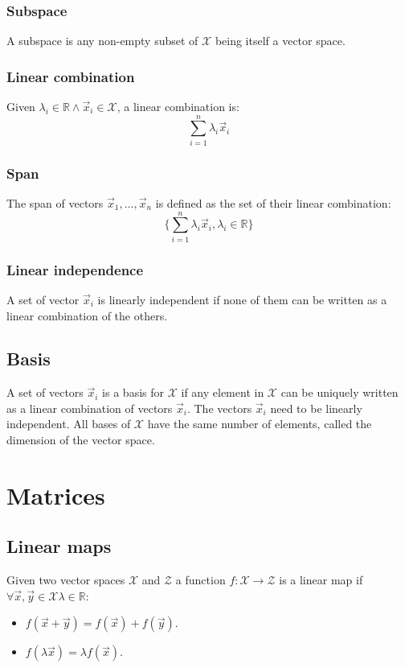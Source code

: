 		\subsubsection{Subspace}
		A subspace is any non-empty subset of $\mathcal{X}$ being itself a vector space.

		\subsubsection{Linear combination}
		Given $\lambda_i\in\mathbb{R}\land \vec{x}_i\in\mathcal{X}$, a linear combination is:
		$$\sum\limits_{i=1}^n\lambda_i \vec{x}_i$$

		\subsubsection{Span}
		The span of vectors $\vec{x}_1, \dots, \vec{x}_n$ is defined as the set of their linear combination:
		$$\bigl\{\sum\limits_{i=1}^n\lambda_i\vec{x}_i, \lambda_i\in\mathbb{R}\bigr\}$$

		\subsubsection{Linear independence}
		A set of vector $\vec{x}_i$ is linearly independent if none of them can be written as a linear combination of the others.

	\subsection{Basis}
	A set of vectors $\vec{x}_i$ is a basis for $\mathcal{X}$ if any element in $\mathcal{X}$ can be uniquely written as a linear combination of vectors $\vec{x}_i$.
	The vectors $\vec{x}_i$ need to be linearly independent.
	All bases of $\mathcal{X}$ have the same number of elements, called the dimension of the vector space.

\section{Matrices}

	\subsection{Linear maps}
	Given two vector spaces $\mathcal{X}$ and $\mathcal{Z}$ a function $f:\mathcal{X}\rightarrow\mathcal{Z}$ is a linear map if $\forall \vec{x}, \vec{y}\in\mathcal{X}\lambda\in\mathbb{R}$:
	\begin{multicols}{2}
		\begin{itemize}
			\item $f(\vec{x} + \vec{y}) = f(\vec{x}) + f(\vec{y})$.
			\item $f(\lambda \vec{x}) = \lambda f(\vec{x})$.
		\end{itemize}
	\end{multicols}


